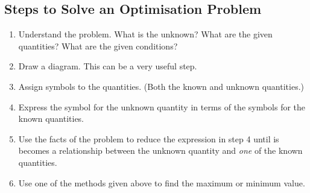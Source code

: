 \subsection{Steps to Solve an Optimisation Problem}
\begin{enumerate}
\item Understand the problem. What is the unknown? What
are the given quantities? What are the given conditions? 

\item Draw
a diagram. This can be a very useful step. 

\item Assign
symbols to the quantities. (Both the known and unknown quantities.) 

\item Express the symbol for the
unknown quantity in terms of the symbols for the known quantities. 

\item Use the facts of the problem
to reduce the expression in step 4 until is becomes a relationship between the unknown quantity and \emph{one} of the known quantities.


\item Use one of the methods given above to find the maximum or minimum value.\vspace{1cm}
\end{enumerate}



